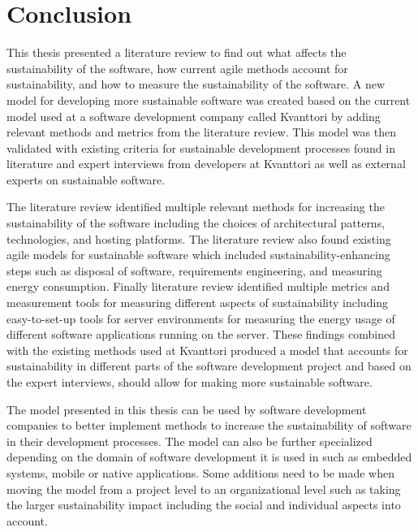 \chapter{Conclusion}\label{conclusion}
This thesis presented a literature review to find out what affects the sustainability of the software, how current agile methods account for sustainability, and how to measure the sustainability of the software. A new model for developing more sustainable software was created based on the current model used at a software development company called Kvanttori by adding relevant methods and metrics from the literature review. This model was then validated with existing criteria for sustainable development processes found in literature and expert interviews from developers at Kvanttori as well as external experts on sustainable software.

The literature review identified multiple relevant methods for increasing the sustainability of the software including the choices of architectural patterns, technologies, and hosting platforms. The literature review also found existing agile models for sustainable software which included sustainability-enhancing steps such as disposal of software, requirements engineering, and measuring energy consumption. Finally literature review identified multiple metrics and measurement tools for measuring different aspects of sustainability including easy-to-set-up tools for server environments for measuring the energy usage of different software applications running on the server. These findings combined with the existing methods used at Kvanttori produced a model that accounts for sustainability in different parts of the software development project and based on the expert interviews, should allow for making more sustainable software.

The model presented in this thesis can be used by software development companies to better implement methods to increase the sustainability of software in their development processes. The model can also be further specialized depending on the domain of software development it is used in such as embedded systems, mobile or native applications. Some additions need to be made when moving the model from a project level to an organizational level such as taking the larger sustainability impact including the social and individual aspects into account.